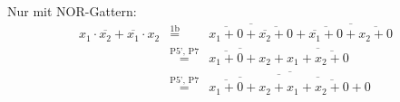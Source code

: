 \documentclass[DIN, pagenumber=false, fontsize=11pt, parskip=half]{scrartcl}
\begin{document}
\begin{enumerate}[label = (\alph*)]
\begin{enumerate}[label = (\roman*)]
\begin{equation*}
                    \end{equation*}
                    Nur mit NOR-Gattern:
                    \begin{eqnarray*}
                        x_1 \cdot \overline{x_2} + \overline{x_1} \cdot x_2 &\stackrel{\text{1b}}{=}& \overline{\overline{x_1 + 0} + \overline{\overline{x_2} + 0}}
                        + \overline{\overline{\overline{x_1} + 0} + \overline{x_2 + 0}} \\
                        &\stackrel{\text{P5', P7}}{=}& \overline{\overline{x_1 + 0} + x_2} + \overline{x_1 + \overline{x_2 + 0}} \\
                        &\stackrel{\text{P5', P7}}{=}& \overline{\overline{\overline{\overline{x_1 + 0} + x_2} + \overline{x_1 + \overline{x_2 + 0}}} + 0}
                    \end{eqnarray*}
            \end{enumerate}
    \end{enumerate}
\end{document}
